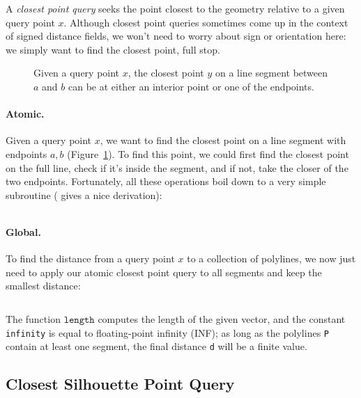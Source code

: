 \documentclass{article}
\newcommand{\code}[1]{\texttt{#1}}
\renewcommand{\vec}[1]{#1}
\begin{document}
A \emph{closest point query} seeks the point closest to the geometry relative to a given query point \(\vec{x}\).  Although closest point queries sometimes come up in the context of signed distance fields, we won't need to worry about sign or orientation here: we simply want to find the closest point, full stop.

\begin{figure}[h!]
   \centering
   
   
   \caption{Given a query point \(\vec{x}\), the closest point \(\vec{y}\) on a line segment between \(\vec{a}\) and \(\vec{b}\) can be at either an interior point or one of the endpoints.\label{fig:ClosestPointExamples}}
\end{figure}

\paragraph{Atomic.} Given a query point \(\vec{x}\), we want to find the closest point on a line segment with endpoints \(\vec{a}, \vec{b}\) (Figure~\ref{fig:ClosestPointExamples}).  To find this point, we could first find the closest point on the full line, check if it's inside the segment, and if not, take the closer of the two endpoints.  Fortunately, all these operations boil down to a very simple subroutine (\citet{Quilez:2020:SLS} gives a nice derivation):

\inputminted[fontsize=\small,linenos,firstline=36,lastline=41,bgcolor=bg]{cpp}{../code/WoStLaplace2D.cpp}

\paragraph{Global.} To find the distance from a query point \(x\) to a collection of polylines, we now just need to apply our atomic closest point query to all segments and keep the smallest distance:

\inputminted[fontsize=\small,linenos,firstline=65,lastline=75,bgcolor=bg]{cpp}{../code/WoStLaplace2D.cpp}
The function \(\code{length}\) computes the length of the given vector, and the constant \code{infinity} is equal to floating-point infinity (INF); as long as the polylines \code{P} contain at least one segment, the final distance \code{d} will be a finite value.

\subsection{Closest Silhouette Point Query}
\label{sec:ClosestSilhouettePointQuery}
\end{document}
